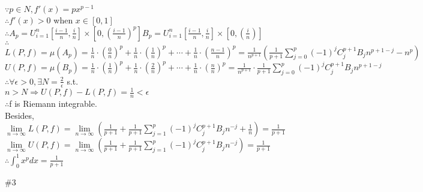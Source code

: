 \documentclass{article}
\begin{document}
$\because$\qquad$p\in N, f'(x)=px^{p-1}$\\

$\therefore$\qquad$f'(x)>0$ when $x\in[0,1]$\\

$\therefore$\qquad$\displaystyle A_p=U_{i=1}^{n}\left[\frac{i-1}{n},\frac{i}{n}\right]\times\left[0,\left(\frac{i-1}{n}\right)^p\right]$\qquad$\displaystyle B_p=U_{i=1}^{n}\left[\frac{i-1}{n},\frac{i}{n}\right]\times\left[0,\left(\frac{i}{n}\right)\right]$\\

$\therefore$\qquad$\displaystyle L(P,f)=\mu(A_p)=\frac{1}{n}\cdot\left(\frac{0}{n}\right)^p+\frac{1}{n}\cdot\left(\frac{1}{n}\right)^p+\cdots+\frac{1}{n}\cdot\left(\frac{n-1}{n}\right)^p=\frac{1}{n^{p+1}}\left(\frac{1}{p+1}\sum \limits_{j=0}^{p}(-1)^jC_j^{p+1}B_jn^{p+1-j}-n^p\right)$\\

\qquad\quad $\displaystyle U(P,f)=\mu(B_p)=\frac{1}{n}\cdot\left(\frac{1}{n}\right)^p+\frac{1}{n}\cdot\left(\frac{2}{n}\right)^p+\cdots+\frac{1}{n}\cdot\left(\frac{n}{n}\right)^p=\frac{1}{n^{p+1}}\cdot\frac{1}{p+1}\sum \limits_{j=0}^{p}(-1)^jC_j^{p+1}B_jn^{p+1-j}$\\

$\therefore$\qquad$\displaystyle\forall\epsilon>0, \exists N=\frac{2}{\epsilon}$ s.t.\\

$\displaystyle n>N\Rightarrow U(P,f)-L(P,f)=\frac{1}{n}<\epsilon$\\

$\therefore$\qquad f is Riemann integrable.\\

Besides, $\displaystyle\lim \limits_{n \to \infty}L(P,f)=\lim \limits_{n \to \infty}\left(\frac{1}{p+1}+\frac{1}{p+1}\sum \limits_{j=1}^p(-1)^jC_j^{p+1}B_jn^{-j}+\frac{1}{n}\right)=\frac{1}{p+1}$\\

\qquad\qquad$\displaystyle\lim \limits_{n \to \infty}U(P,f)=\lim \limits_{n \to \infty}\left(\frac{1}{p+1}+\frac{1}{p+1}\sum \limits_{j=1}^p(-1)^jC_j^{p+1}B_jn^{-j}\right)=\frac{1}{p+1}$\\

$\therefore$\qquad$\displaystyle \int_0^1x^pdx=\frac{1}{p+1}$\\

\vskip 2cm

\textcolor[rgb]{0.00,0.00,0.50}{\#3}\\
\end{document}
